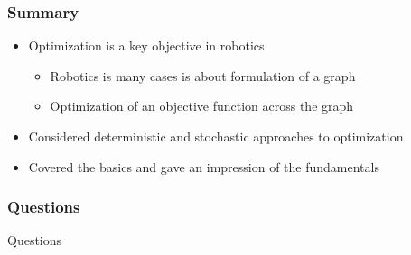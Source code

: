 \documentclass[10pt]{beamer}
\begin{document}
\begin{frame}
  \frametitle{Summary}
  \begin{itemize}
  \item Optimization is a key objective in robotics
    \begin{itemize}
    \item Robotics is many cases is about formulation of a graph
    \item Optimization of an objective function across the graph
    \end{itemize}
  \item Considered deterministic and stochastic approaches to
    optimization
  \item Covered the basics and gave an impression of the fundamentals
  \end{itemize}
\end{frame}

\begin{frame}
  \frametitle{Questions}
  \centerline{\Huge Questions}
\end{frame}
\end{document}

